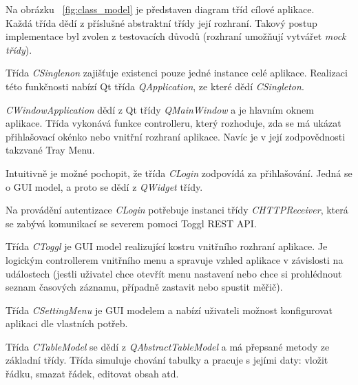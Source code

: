 \documentclass[thesis=B,czech]{FITthesis}[2012/06/26]
\begin{document}
Na obrázku  ~\ref{fig:class_model} je  představen  diagram tříd cílové aplikace. \\
Každá třída dědí z příslušné abstraktní třídy její rozhraní. Takový postup implementace byl zvolen z testovacích důvodů (rozhraní umožňují vytvářet \textit{mock třídy}).  \par
Třída \textit{CSinglenon} zajišťuje existenci pouze jedné instance celé aplikace. Realizaci této funkčnosti nabízí Qt třída \textit{QApplication}, ze které dědí \textit{CSingleton}.\par
\textit{CWindowApplication} dědí z Qt třídy \textit{QMainWindow} a je hlavním oknem aplikace. Třída vykonává funkce controlleru, který rozhoduje, zda se má ukázat  přihlašovací okénko nebo vnitřní rozhraní aplikace. Navíc je v její zodpovědnosti takzvané Tray Menu.\par
Intuitivně je možné pochopit, že třída \textit{CLogin} zodpovídá za přihlašování. Jedná se o GUI model, a proto se dědí z \textit{QWidget} třídy. \par
Na provádění autentizace \textit{CLogin} potřebuje instanci třídy \textit{CHTTPReceiver}, která se zabývá komunikací se severem pomoci Toggl REST API.\par
Třída \textit{CToggl} je GUI model realizující kostru vnitřního rozhraní aplikace. Je logickým controllerem vnitřního menu a spravuje vzhled aplikace v závislosti na událostech (jestli uživatel chce otevřít menu nastavení nebo chce si prohlédnout seznam časových záznamu, případně zastavit nebo spustit měřič).\par
Třída \textit{CSettingMenu} je GUI modelem a nabízí uživateli možnost konfigurovat aplikaci dle vlastních potřeb.\par
Třída \textit{CTableModel} se dědí z \textit{QAbstractTableModel} a má přepsané metody ze základní třídy. Třída simuluje chování tabulky a pracuje s jejími daty: vložit řádku, smazat řádek, editovat obsah atd.\par
\end{document}
